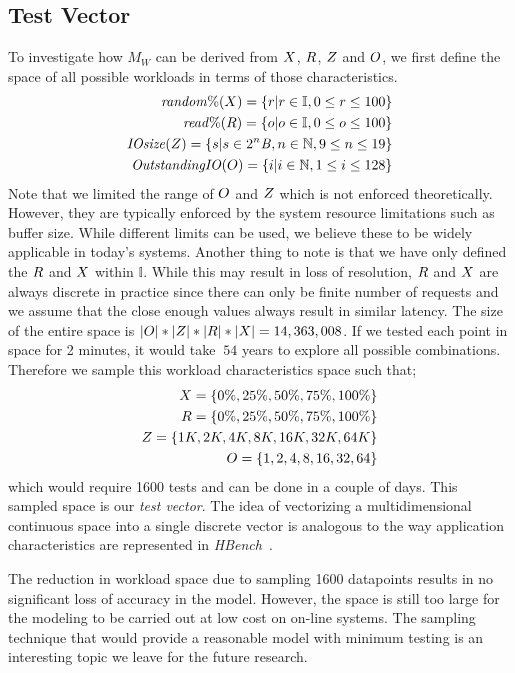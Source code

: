 \subsection{Test Vector}
To investigate how $M_W$ can be derived from $X$, $R$, $Z$ and $O$, we first define the space of all possible workloads in terms of those characteristics.
\begin{align}
\mathit{random\%} (X) = \{r|r \in \mathbb{I}, 0\le r \le 100\} \\
\mathit{read\%} (R) = \{o|o \in \mathbb{I}, 0\le o \le 100\}\\
\mathit{IOsize} (Z) = \{s|s \in 2^n\mathit{B}, n \in \mathbb{N},  9 \le n \le 19\}\\
\mathit{OutstandingIO} (O) = \{ i|i \in \mathbb{N}, 1\le i\le128 \}
\end{align}
Note that we limited the range of $O$ and $Z$ which is not enforced theoretically.
However, they are typically enforced by the system resource limitations such as buffer size.
While different limits can be used, we believe these to be widely applicable in today's systems.
Another thing to note is that we have only defined the $R$ and $X$ within $\mathbb{I}$.
While this may result in loss of resolution, $R$ and $X$ are always discrete in practice since there can only be finite number of requests and we assume that the close enough values always result in similar latency.
The size of the entire space is $|O| * |Z| * |R| * |X| = 14,363,008$.
If we tested each point in space for 2 minutes, it would take $~54$ years to explore all possible combinations.
Therefore we sample this workload characteristics space such that;
\begin{align}
X=\{0\%, 25\%, 50\%, 75\%, 100\%\}\\
R=\{0\%, 25\%, 50\%, 75\%, 100\%\}\\
Z=\{1K, 2K, 4K, 8K, 16K, 32K, 64K\}\\
O=\{1, 2, 4, 8, 16, 32, 64\}
\end{align}
which would require 1600 tests and can be done in a couple of days.
This sampled space is our \emph{test vector}.
The idea of vectorizing a multidimensional continuous space into a single discrete vector is analogous to the way application characteristics are represented in \emph{HBench}~\cite{seltzer:1999}.

The reduction in workload space due to sampling 1600 datapoints results in no significant loss of accuracy in the model.
However, the space is still too large for the modeling to be carried out at low cost on on-line systems.
The sampling technique that would provide a reasonable model with minimum testing is an interesting topic we leave for the future research.

